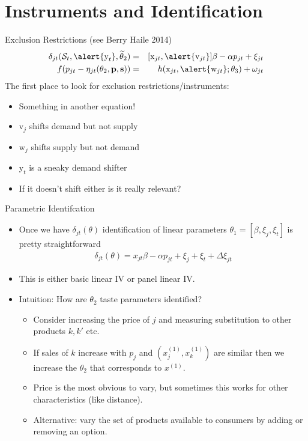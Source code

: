 \section{Instruments and Identification}
\begin{frame}{Exclusion Restrictions (see Berry Haile 2014)}
\begin{eqnarray*}
    \delta_{jt}(\mathcal{S}_t,\alert{\textrm{y}_t}, \widetilde{\theta}_2) &=&  [\textrm{x}_{jt}, \alert{\textrm{v}_{jt}}]  \beta  - \alpha p_{jt} + \xi_{jt}\\
    f(p_{jt} - \eta_{jt}(\theta_2,\mathbf{p},\mathbf{s})) &=&   h(\textrm{x}_{jt},\alert{\textrm{w}_{jt}};\theta_3)+\omega_{jt}
\end{eqnarray*}
The first place to look for exclusion restrictions/instruments:
\begin{itemize}
\item Something in another equation!
\item $\textrm{v}_j$ shifts demand but not supply
\item $\textrm{w}_j$ shifts supply but not demand
\item $\textrm{y}_t$ is a sneaky demand shifter
\item If it doesn't shift either is it really relevant?
\end{itemize}
\end{frame}



\begin{frame}{Parametric Identifcation}
\begin{itemize}
\item Once we have $\delta_{jt}(\theta)$ identification of linear parameters $\theta_1=[\beta,\xi_j, \xi_t]$ is pretty straightforward
\begin{eqnarray*}
\delta_{jt}(\theta) = x_{jt} \beta - \alpha p_{jt} + \xi_j + \xi_t + \Delta \xi_{jt}
\end{eqnarray*}
\item This is either basic linear IV or panel linear IV.
\item Intuition: How are $\theta_2$ taste parameters identified?
\begin{itemize}
\item Consider increasing the price of $j$ and measuring substitution to other products $k,k'$ etc.
\item If sales of $k$ increase with $p_j$ and $(x_j^{(1)},x_k^{(1)})$ are similar then we increase the $\theta_2$ that corresponds to $x^{(1)}$.
\item Price is the most obvious to vary, but sometimes this works for other characteristics (like distance).
\item Alternative: vary the set of products available to consumers by adding or removing an option.
\end{itemize}
\end{itemize}
\end{frame}



